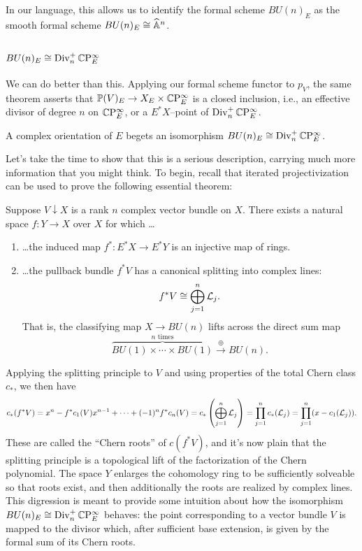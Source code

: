 \noindent In our language, this allows us to identify the formal scheme $BU(n)_E$ as the smooth formal scheme $BU(n)_E \cong \widehat{\mathbb{A}}^n$.


\subsection{$BU(n)_E \cong \operatorname{Div}_n^+ \mathbb{C}\mathrm P^\infty_E$}

We can do better than this.  Applying our formal scheme functor to $p_V$, the same theorem asserts that $\mathbb{P}(V)_E \to X_E \times \mathbb{C}\mathrm P^\infty_E$ is a closed inclusion, i.e., an effective divisor of degree $n$ on $\mathbb{C}\mathrm P^\infty_E$, or a $E^* X$--point of $\operatorname{Div}_n^+ \mathbb{C}\mathrm P^\infty_E$.

\begin{theorem}
A complex orientation of $E$ begets an isomorphism $BU(n)_E \cong \operatorname{Div}_n^+ \mathbb{C}\mathrm P^\infty_E$.
\end{theorem}

\noindent Let's take the time to show that this is a serious description, carrying much more information that you might think. To begin, recall that iterated projectivization can be used to prove the following essential theorem:

\begin{theorem}
Suppose $V \downarrow X$ is a rank $n$ complex vector bundle on $X$.  There exists a natural space $f: Y \to X$ over $X$ for which \ldots
\begin{enumerate}
\item \ldots the induced map $f^*: E^* X \to E^* Y$ is an injective map of rings.
\item \ldots the pullback bundle $f^* V$ has a canonical splitting into complex lines: \[f^* V \cong \bigoplus_{j=1}^n \mathcal{L}_j.\]  That is, the classifying map $X \to BU(n)$ lifts across the direct sum map \[\overset{\text{$n$ times}}{\overbrace{BU(1) \times \cdots \times BU(1)}} \xrightarrow{\oplus} BU(n).\]
\end{enumerate}
\end{theorem}

Applying the splitting principle to $V$ and using properties of the total Chern class $c_*$, we then have
\[
c_*(f^* V) = x^n - f^* c_1(V) x^{n-1} + \cdots + (-1)^n f^* c_n(V) = c_*\left( \bigoplus_{j=1}^n \mathcal{L}_j \right) = \prod_{j=1}^n c_*(\mathcal{L}_j) = \prod_{j=1}^n (x - c_1(\mathcal{L}_j)).
\]
These are called the ``Chern roots'' of $c(f^* V)$, and it's now plain that the splitting principle is a topological lift of the factorization of the Chern polynomial.  The space $Y$ enlarges the cohomology ring to be sufficiently solveable so that roots exist, and then additionally the roots are realized by complex lines.  This digression is meant to provide some intuition about how the isomorphism $BU(n)_E \cong \operatorname{Div}_n^+ \mathbb{C}\mathrm P^\infty_E$ behaves: the point corresponding to a vector bundle $V$ is mapped to the divisor which, after sufficient base extension, is given by the formal sum of its Chern roots.

